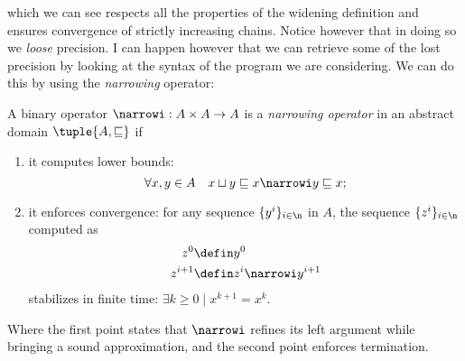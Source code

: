 which we can see respects all the properties of the widening
definition and ensures convergence of strictly increasing chains.
Notice however that in doing so we \emph{loose} precision. I can
happen however that we can retrieve some of the lost precision by
looking at the syntax of the program we are considering. We can do
this by using the \emph{narrowing} operator:

\begin{definition}[Narrowing]
  A binary operator \(\narrowi : A \times A \to A\) is a
  \emph{narrowing operator} in an abstract domain
  \(\tuple{A, \sqsubseteq}\) if
  \begin{enumerate}
  \item it computes lower bounds:
    \begin{equation*}
      \forall x, y \in A \quad x \sqcup y \sqsubseteq x \narrowi y \sqsubseteq x;
    \end{equation*}
  \item it enforces convergence: for any sequence \(\{y^i\}_{i\in\n}\)
    in \(A\), the sequence \(\{z^i\}_{i\in\n}\) computed as
    \begin{align*}
      z^0 & \defin y^0 \\
      z^{i+1} & \defin z^i \narrowi y^{i+1}
    \end{align*}
    stabilizes in finite time: \(\exists k \geq 0 \mid x^{k+1} = x^k\).
  \end{enumerate}
\end{definition}

Where the first point states that \(\narrowi\) refines its left
argument while bringing a sound approximation, and the second point
enforces termination.
